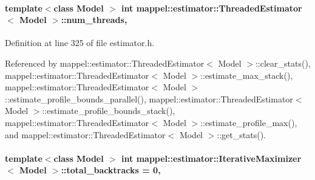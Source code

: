 \paragraph[{\texorpdfstring{num\+\_\+threads}{num_threads}}]{\setlength{\rightskip}{0pt plus 5cm}template$<$class Model $>$ int {\bf mappel\+::estimator\+::\+Threaded\+Estimator}$<$ Model $>$\+::num\+\_\+threads\hspace{0.3cm}{\ttfamily [protected]}, {\ttfamily [inherited]}}\hypertarget{classmappel_1_1estimator_1_1ThreadedEstimator_af746a83929a7217b4084d0e10f850bc3}{}\label{classmappel_1_1estimator_1_1ThreadedEstimator_af746a83929a7217b4084d0e10f850bc3}


Definition at line 325 of file estimator.\+h.



Referenced by mappel\+::estimator\+::\+Threaded\+Estimator$<$ Model $>$\+::clear\+\_\+stats(), mappel\+::estimator\+::\+Threaded\+Estimator$<$ Model $>$\+::estimate\+\_\+max\+\_\+stack(), mappel\+::estimator\+::\+Threaded\+Estimator$<$ Model $>$\+::estimate\+\_\+profile\+\_\+bounds\+\_\+parallel(), mappel\+::estimator\+::\+Threaded\+Estimator$<$ Model $>$\+::estimate\+\_\+profile\+\_\+bounds\+\_\+stack(), mappel\+::estimator\+::\+Threaded\+Estimator$<$ Model $>$\+::estimate\+\_\+profile\+\_\+max(), and mappel\+::estimator\+::\+Threaded\+Estimator$<$ Model $>$\+::get\+\_\+stats().

\paragraph[{\texorpdfstring{total\+\_\+backtracks}{total_backtracks}}]{\setlength{\rightskip}{0pt plus 5cm}template$<$class Model $>$ int {\bf mappel\+::estimator\+::\+Iterative\+Maximizer}$<$ Model $>$\+::total\+\_\+backtracks = 0\hspace{0.3cm}{\ttfamily [protected]}, {\ttfamily [inherited]}}\hypertarget{classmappel_1_1estimator_1_1IterativeMaximizer_a1e081c237c989c530bb101bfb4791073}{}\label{classmappel_1_1estimator_1_1IterativeMaximizer_a1e081c237c989c530bb101bfb4791073}


